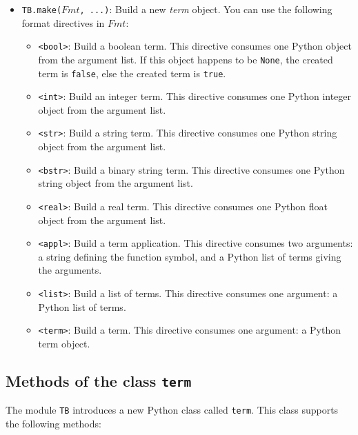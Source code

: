 \begin{itemize}
\item {\tt TB.make($Fmt$, ...)}: Build a new \emph{term} object. You can use
      the following format directives in $Fmt$:
      \begin{itemize}
      \item {\tt <bool>}: Build a boolean term. This directive consumes
	one Python object from the argument list. If this object happens
	to be {\tt None}, the created term is {\tt false}, else the created
	term is {\tt true}.
      \item {\tt <int>}: Build an integer term. This directive consumes
	one Python integer object from the argument list.
      \item {\tt <str>}: Build a string term. This directive consumes one
	Python string object from the argument list.
      \item {\tt <bstr>}: Build a binary string term. 
        This directive consumes one Python string object from the argument 
        list.
      \item {\tt <real>}: Build a real term. This directive consumes one
	Python float object from the argument list.
      \item {\tt <appl>}: Build a term application. This directive consumes
	two arguments: a string defining the function symbol, and a Python list
	of terms giving the arguments.
      \item {\tt <list>}: Build a list of terms. This directive consumes
	one argument: a Python list of terms.
      \item {\tt <term>}: Build a term. This directive consumes one
        argument: a Python term object.
      \end{itemize}

\end{itemize}

\subsection{\label{term-methods}Methods of the class {\tt term}}

The module {\tt TB} introduces a new Python class called {\tt term}.
This class supports the following methods:

